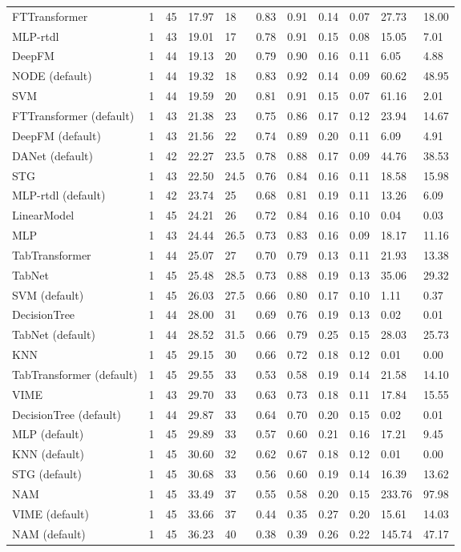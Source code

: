 \begin{tabular}{lllllllllll}
FTTransformer & 1 & 45 & 17.97 & 18 & 0.83 & 0.91 & 0.14 & 0.07 & 27.73 & 18.00 \\
MLP-rtdl & 1 & 43 & 19.01 & 17 & 0.78 & 0.91 & 0.15 & 0.08 & 15.05 & 7.01 \\
DeepFM & 1 & 44 & 19.13 & 20 & 0.79 & 0.90 & 0.16 & 0.11 & 6.05 & 4.88 \\
NODE (default) & 1 & 44 & 19.32 & 18 & 0.83 & 0.92 & 0.14 & 0.09 & 60.62 & 48.95 \\
SVM & 1 & 44 & 19.59 & 20 & 0.81 & 0.91 & 0.15 & 0.07 & 61.16 & 2.01 \\
FTTransformer (default) & 1 & 43 & 21.38 & 23 & 0.75 & 0.86 & 0.17 & 0.12 & 23.94 & 14.67 \\
DeepFM (default) & 1 & 43 & 21.56 & 22 & 0.74 & 0.89 & 0.20 & 0.11 & 6.09 & 4.91 \\
DANet (default) & 1 & 42 & 22.27 & 23.5 & 0.78 & 0.88 & 0.17 & 0.09 & 44.76 & 38.53 \\
STG & 1 & 43 & 22.50 & 24.5 & 0.76 & 0.84 & 0.16 & 0.11 & 18.58 & 15.98 \\
MLP-rtdl (default) & 1 & 42 & 23.74 & 25 & 0.68 & 0.81 & 0.19 & 0.11 & 13.26 & 6.09 \\
LinearModel & 1 & 45 & 24.21 & 26 & 0.72 & 0.84 & 0.16 & 0.10 & 0.04 & 0.03 \\
MLP & 1 & 43 & 24.44 & 26.5 & 0.73 & 0.83 & 0.16 & 0.09 & 18.17 & 11.16 \\
TabTransformer & 1 & 44 & 25.07 & 27 & 0.70 & 0.79 & 0.13 & 0.11 & 21.93 & 13.38 \\
TabNet & 1 & 45 & 25.48 & 28.5 & 0.73 & 0.88 & 0.19 & 0.13 & 35.06 & 29.32 \\
SVM (default) & 1 & 45 & 26.03 & 27.5 & 0.66 & 0.80 & 0.17 & 0.10 & 1.11 & 0.37 \\
DecisionTree & 1 & 44 & 28.00 & 31 & 0.69 & 0.76 & 0.19 & 0.13 & 0.02 & 0.01 \\
TabNet (default) & 1 & 44 & 28.52 & 31.5 & 0.66 & 0.79 & 0.25 & 0.15 & 28.03 & 25.73 \\
KNN & 1 & 45 & 29.15 & 30 & 0.66 & 0.72 & 0.18 & 0.12 & 0.01 & 0.00 \\
TabTransformer (default) & 1 & 45 & 29.55 & 33 & 0.53 & 0.58 & 0.19 & 0.14 & 21.58 & 14.10 \\
VIME & 1 & 43 & 29.70 & 33 & 0.63 & 0.73 & 0.18 & 0.11 & 17.84 & 15.55 \\
DecisionTree (default) & 1 & 44 & 29.87 & 33 & 0.64 & 0.70 & 0.20 & 0.15 & 0.02 & 0.01 \\
MLP (default) & 1 & 45 & 29.89 & 33 & 0.57 & 0.60 & 0.21 & 0.16 & 17.21 & 9.45 \\
KNN (default) & 1 & 45 & 30.60 & 32 & 0.62 & 0.67 & 0.18 & 0.12 & 0.01 & 0.00 \\
STG (default) & 1 & 45 & 30.68 & 33 & 0.56 & 0.60 & 0.19 & 0.14 & 16.39 & 13.62 \\
NAM & 1 & 45 & 33.49 & 37 & 0.55 & 0.58 & 0.20 & 0.15 & 233.76 & 97.98 \\
VIME (default) & 1 & 45 & 33.66 & 37 & 0.44 & 0.35 & 0.27 & 0.20 & 15.61 & 14.03 \\
NAM (default) & 1 & 45 & 36.23 & 40 & 0.38 & 0.39 & 0.26 & 0.22 & 145.74 & 47.17 \\
\bottomrule
\end{tabular}
